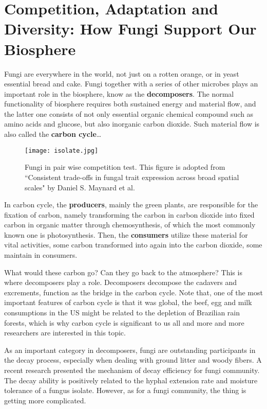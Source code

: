 \section*{Competition, Adaptation and Diversity: How Fungi Support Our Biosphere}

\setcounter{figure}{0}

Fungi are everywhere in the world, not just on a rotten orange, or in yeast essential bread and cake. Fungi together with a series of other microbes plays an important role in the biosphere, know as the \textbf{decomposers}. The normal functionality of biosphere requires both sustained energy and material flow, and the latter one consists of not only essential organic chemical compound such as amino acids and glucose, but also inorganic carbon dioxide. Such material flow is also called the \textbf{carbon cycle}\dots

\begin{figure}[ht]
    \centering
    \texttt{[image: isolate.jpg]}
    \caption{Fungi in pair wise competition test. This figure is adopted from ``Consistent trade-offs in fungal trait expression across broad spatial scales" by Daniel S. Maynard et al.}
    \label{fig:decom-hyphal-122d}
\end{figure}

In carbon cycle, the \textbf{producers}, mainly the green plants, are responsible for the fixation of carbon, namely transforming the carbon in carbon dioxide into fixed carbon in organic matter through chemosynthesis, of which the most commonly known one is photosynthesis. Then, the \textbf{consumers} utilize these material for vital activities, some carbon transformed into again into the carbon dioxide, some maintain in consumers.

What would these carbon go? Can they go back to the atmosphere? This is where decomposers play a role. Decomposers decompose the cadavers and excrements, function as the bridge in the carbon cycle. Note that, one of the most important features of carbon cycle is that it was global, the beef, egg and milk consumptions in the US might be related to the depletion of Brazilian rain forests, which is why carbon cycle is significant to us all and more and more researchers are interested in this topic.

As an important category in decomposers, fungi are outstanding participants in the decay process, especially when dealing with ground litter and woody fibers. A recent research presented the mechanism of decay efficiency for fungi community. The decay ability is positively related to the hyphal extension rate and moisture tolerance of a fungus isolate. However, as for a fungi community, the thing is getting more complicated.

